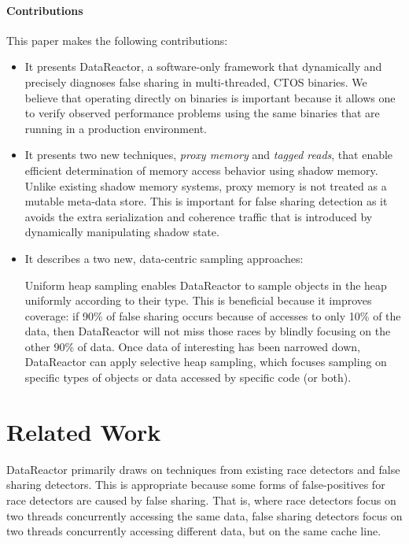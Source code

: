 \documentclass{sig-alternate}
\newcommand{\Toolname}{DataReactor}
\begin{document}
\paragraph{Contributions}
This paper makes the following contributions:
\begin{itemize}
\item It presents \Toolname{}, a software-only framework that dynamically and precisely diagnoses
false sharing  in multi-threaded, CTOS binaries. We believe that operating directly on binaries is
important because it allows one to verify observed performance problems using the same binaries
that are running in a production environment.

\item It presents two new techniques, \emph{proxy memory} and \emph{tagged reads}, that enable
efficient determination of memory access behavior using shadow memory. Unlike existing shadow
memory systems, proxy memory is not treated as a mutable meta-data store. This is important
for false sharing detection as it avoids the extra serialization and coherence traffic that is introduced
by dynamically manipulating shadow state.

\item It describes a two new, data-centric sampling approaches:  Uniform heap sampling enables \Toolname{} to sample objects in the heap uniformly
according to their type. This is beneficial because it improves coverage: if 90\% of false sharing occurs because
of accesses to only 10\% of the data, then \Toolname{} will not miss those races by blindly focusing on the
other 90\% of data. Once data of interesting has been narrowed down, \Toolname{} can apply selective heap
sampling, which focuses sampling on specific types of objects or data accessed by specific code (or both).
\end{itemize}



\section{Related Work}\label{sec:background}
\Toolname{} primarily draws on techniques from existing race detectors and false sharing detectors.
This is appropriate because some forms of false-positives for race detectors are caused by false
sharing. That is, where race detectors focus on two threads concurrently accessing the same
data, false sharing detectors focus on two threads concurrently accessing different data, but
on the same cache line.
\end{document}
